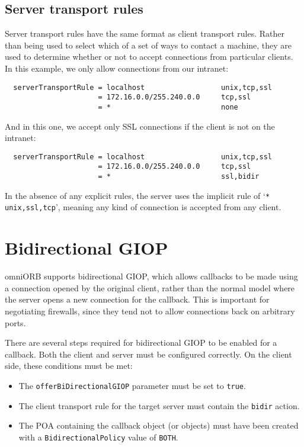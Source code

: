 \documentclass[11pt,oneside,a4paper]{book}
\newcommand{\code}[1]{\texttt{#1}}
\newcommand{\dsc}{\discretionary{}{}{}}
\begin{document}
\subsection{Server transport rules}
\label{sec:serverRule}

Server transport rules have the same format as client transport
rules. Rather than being used to select which of a set of ways to
contact a machine, they are used to determine whether or not to accept
connections from particular clients. In this example, we only allow
connections from our intranet:

\begin{verbatim}
  serverTransportRule = localhost                  unix,tcp,ssl
                      = 172.16.0.0/255.240.0.0     tcp,ssl
                      = *                          none
\end{verbatim}

\noindent And in this one, we accept only SSL connections if the
client is not on the intranet:

\begin{verbatim}
  serverTransportRule = localhost                  unix,tcp,ssl
                      = 172.16.0.0/255.240.0.0     tcp,ssl
                      = *                          ssl,bidir
\end{verbatim}

\noindent In the absence of any explicit rules, the server uses the
implicit rule of `\code{* unix,\dsc{}ssl,tcp}', meaning any kind of
connection is accepted from any client.


\section{Bidirectional GIOP}
\label{sec:bidir}

omniORB supports bidirectional GIOP, which allows callbacks to be made
using a connection opened by the original client, rather than the
normal model where the server opens a new connection for the callback.
This is important for negotiating firewalls, since they tend not to
allow connections back on arbitrary ports.

There are several steps required for bidirectional GIOP to be enabled
for a callback. Both the client and server must be configured
correctly. On the client side, these conditions must be met:

\begin{itemize}

\item The \code{offerBiDirectionalGIOP} parameter must be set to \code{true}. 
\item The client transport rule for the target server must contain the
      \code{bidir} action.
\item The POA containing the callback object (or objects) must have
      been created with a \code{BidirectionalPolicy} value of
      \code{BOTH}.

\end{itemize}
\end{document}
